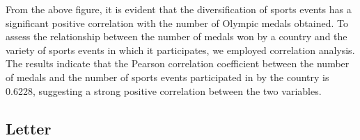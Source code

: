 \documentclass{mcmthesis}
\begin{document}
From the above figure, it is evident that the diversification of sports events has a significant positive correlation with the number of Olympic medals obtained. To assess the relationship between the number of medals won by a country and the variety of sports events in which it participates, we employed correlation analysis. The results indicate that the Pearson correlation coefficient between the number of medals and the number of sports events participated in by the country is 0.6228, suggesting a strong positive correlation between the two variables.

\newpage

\subsection{Letter}
\end{document}
